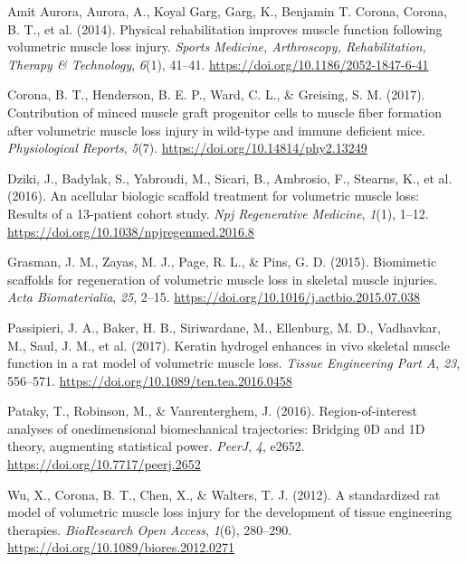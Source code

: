 \documentclass[
]{agujournal2019}
\newlength{\cslhangindent}
\newenvironment{CSLReferences}[2] %
 {\begin{list}{}{%
  \setlength{\itemindent}{0pt}
  \setlength{\leftmargin}{0pt}
  \setlength{\parsep}{0pt}
  \ifodd #1
   \setlength{\leftmargin}{\cslhangindent}
   \setlength{\itemindent}{-1\cslhangindent}
  \fi
  \setlength{\itemsep}{#2\baselineskip}}}
 {\end{list}}
\begin{document}
\protect{}\label{refs}
\begin{CSLReferences}{1}{0}
Amit Aurora, Aurora, A., Koyal Garg, Garg, K., Benjamin T. Corona,
Corona, B. T., et al. (2014). Physical rehabilitation improves muscle
function following volumetric muscle loss injury. \emph{Sports Medicine,
Arthroscopy, Rehabilitation, Therapy \& Technology}, \emph{6}(1),
41--41. \url{https://doi.org/10.1186/2052-1847-6-41}

Corona, B. T., Henderson, B. E. P., Ward, C. L., \& Greising, S. M.
(2017). Contribution of minced muscle graft progenitor cells to muscle
fiber formation after volumetric muscle loss injury in wild-type and
immune deficient mice. \emph{Physiological Reports}, \emph{5}(7).
\url{https://doi.org/10.14814/phy2.13249}

Dziki, J., Badylak, S., Yabroudi, M., Sicari, B., Ambrosio, F., Stearns,
K., et al. (2016). An acellular biologic scaffold treatment for
volumetric muscle loss: Results of a 13-patient cohort study. \emph{Npj
Regenerative Medicine}, \emph{1}(1), 1--12.
\url{https://doi.org/10.1038/npjregenmed.2016.8}

Grasman, J. M., Zayas, M. J., Page, R. L., \& Pins, G. D. (2015).
Biomimetic scaffolds for regeneration of volumetric muscle loss in
skeletal muscle injuries. \emph{Acta Biomaterialia}, \emph{25}, 2--15.
\url{https://doi.org/10.1016/j.actbio.2015.07.038}

Passipieri, J. A., Baker, H. B., Siriwardane, M., Ellenburg, M. D.,
Vadhavkar, M., Saul, J. M., et al. (2017). Keratin hydrogel enhances in
vivo skeletal muscle function in a rat model of volumetric muscle loss.
\emph{Tissue Engineering Part A}, \emph{23}, 556--571.
\url{https://doi.org/10.1089/ten.tea.2016.0458}

Pataky, T., Robinson, M., \& Vanrenterghem, J. (2016).
Region-of-interest analyses of onedimensional biomechanical
trajectories: {Bridging 0D} and {1D} theory, augmenting statistical
power. \emph{PeerJ}, \emph{4}, e2652.
\url{https://doi.org/10.7717/peerj.2652}

Wu, X., Corona, B. T., Chen, X., \& Walters, T. J. (2012). A
standardized rat model of volumetric muscle loss injury for the
development of tissue engineering therapies. \emph{BioResearch Open
Access}, \emph{1}(6), 280--290.
\url{https://doi.org/10.1089/biores.2012.0271}

\end{CSLReferences}
\end{document}
